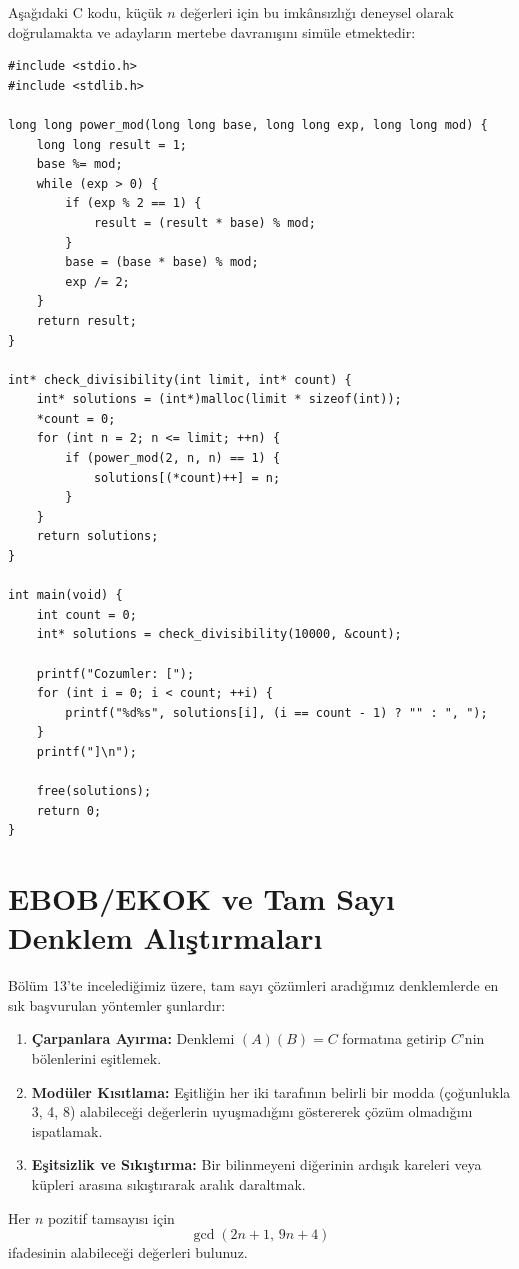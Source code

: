 Aşağıdaki C kodu, küçük $n$ değerleri için bu imkânsızlığı deneysel olarak doğrulamakta ve adayların mertebe davranışını simüle etmektedir:

\begin{lstlisting}[language=CTemel]
#include <stdio.h>
#include <stdlib.h>

long long power_mod(long long base, long long exp, long long mod) {
    long long result = 1;
    base %= mod;
    while (exp > 0) {
        if (exp % 2 == 1) {
            result = (result * base) % mod;
        }
        base = (base * base) % mod;
        exp /= 2;
    }
    return result;
}

int* check_divisibility(int limit, int* count) {
    int* solutions = (int*)malloc(limit * sizeof(int));
    *count = 0;
    for (int n = 2; n <= limit; ++n) {
        if (power_mod(2, n, n) == 1) {
            solutions[(*count)++] = n;
        }
    }
    return solutions;
}

int main(void) {
    int count = 0;
    int* solutions = check_divisibility(10000, &count);

    printf("Cozumler: [");
    for (int i = 0; i < count; ++i) {
        printf("%d%s", solutions[i], (i == count - 1) ? "" : ", ");
    }
    printf("]\n");

    free(solutions);
    return 0;
}\end{lstlisting}

\section{EBOB/EKOK ve Tam Sayı Denklem Alıştırmaları}

Bölüm 13'te incelediğimiz üzere, tam sayı çözümleri aradığımız denklemlerde en sık başvurulan yöntemler şunlardır:
\begin{enumerate}
    \item \textbf{Çarpanlara Ayırma:} Denklemi $(A)(B) = C$ formatına getirip $C$'nin bölenlerini eşitlemek.
    \item \textbf{Modüler Kısıtlama:} Eşitliğin her iki tarafının belirli bir modda (çoğunlukla 3, 4, 8) alabileceği değerlerin uyuşmadığını göstererek çözüm olmadığını ispatlamak.
    \item \textbf{Eşitsizlik ve Sıkıştırma:} Bir bilinmeyeni diğerinin ardışık kareleri veya küpleri arasına sıkıştırarak aralık daraltmak.
\end{enumerate}

\begin{example}
Her $n$ pozitif tamsayısı için
\[
\gcd(2n + 1, \, 9n + 4)
\]
ifadesinin alabileceği değerleri bulunuz.
\end{example}

